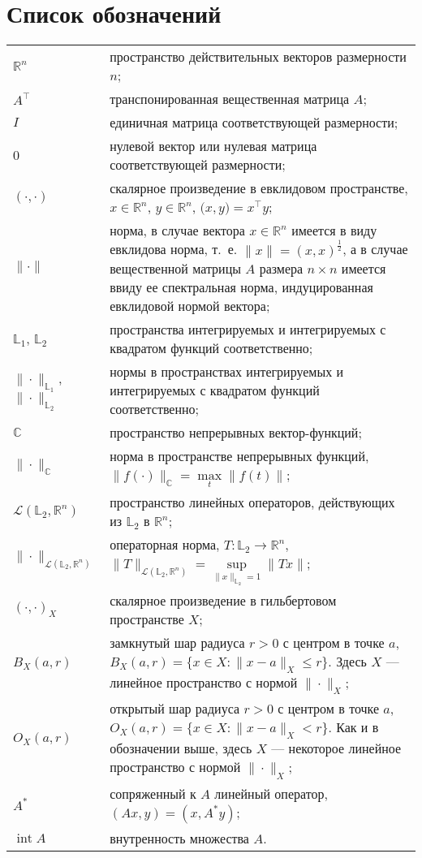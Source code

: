\documentclass[../main.tex]{subfiles}
\begin{document}
\clearpage
\section*{Список обозначений}
\begin{tabularx}{\textwidth}{lY}
 $\mathbb{R}^n$ & пространство действительных векторов размерности $n$; \\ 
 $A^{\top}$ & транспонированная вещественная матрица $A$; \\ 
 $I$ & единичная матрица соответствующей размерности; \\ 
 $0$ & нулевой вектор или нулевая матрица соответствующей размерности; \\
 $(\cdot,\cdot)$ & скалярное произведение в евклидовом пространстве, $x \in \mathbb{R}^n$, $y \in \mathbb{R}^n$, $ \Big(x, y\Big) = x^{\top} y$; \\
 $\| \cdot\| $ & норма, в случае вектора $x \in \mathbb{R}^n$ имеется в виду евклидова норма, т.~е. $\|x\| = (x,x)^{\frac{1}{2}}$, а в случае вещественной матрицы $A$ размера $n \times n$ имеется ввиду ее спектральная норма, индуцированная евклидовой нормой вектора; \\
 $\mathbb{L}_1$, $\mathbb{L}_2$ & пространства интегрируемых и интегрируемых с квадратом функций соответственно; \\
 $\|\cdot\|_{\mathbb{L}_1}$, $\|\cdot\|_{\mathbb{L}_2}$ & нормы в пространствах интегрируемых и интегрируемых с квадратом функций соответственно; \\
 $ \mathbb{C} $ & пространство непрерывных вектор-функций; \\
 $\|\cdot\|_\mathbb{C}$ & норма в пространстве непрерывных функций, $\|f(\cdot) \|_\mathbb{C} = \max\limits_{t} \|f(t)\|$; \\
 $\mathcal{L}(\mathbb{L}_2, \mathbb{R}^n)$ & пространство линейных операторов, действующих из $\mathbb{L}_2$ в $\mathbb{R}^n$; \\ 
 $\| \cdot \|_{\mathcal{L}(\mathbb{L}_2, \mathbb{R}^n)}$ & операторная норма, $T: \mathbb{L}_2 \to \mathbb{R}^n $, $\| T \|_{\mathcal{L}(\mathbb{L}_2, \mathbb{R}^n)} = \sup\limits_{\|x\|_{\mathbb{L}_2} = 1} \| T x \| $;\\
 $(\cdot,\cdot)_{X}$ & скалярное произведение в гильбертовом пространстве $X$; \\
 $B_X(a,r)$ & замкнутый шар радиуса $r>0$ с центром в точке $a$, $B_X(a, r) = \{x\in X: \|x-a\|_X \leqslant r \}$. Здесь $X$ --- линейное пространство с нормой $\|\cdot\|_X$; \\
 $O_{X}(a, r)$ & открытый шар радиуса $r>0$ с центром в точке $a$, $O_{X}(a, r) = \{x\in X: \|x-a\|_X < r \}$. Как и в обозначении выше, здесь $X$ --- некоторое линейное пространство с нормой $\|\cdot\|_X$; \\
 $ A^* $ & сопряженный к $A$ линейный оператор, $(Ax, y) = (x, A^*y)$; \\
 $ \operatorname{int}A $ & внутренность множества $A$. \\
\end{tabularx}
\end{document}
